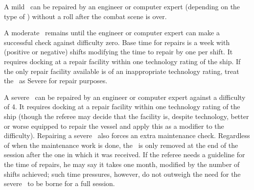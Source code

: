 A mild \Consequence\ can be repaired by an engineer or computer expert (depending on the type of \Consequence) without a roll after the combat scene is over.

A moderate \Consequence\ remains until the engineer or computer expert can make a successful check against difficulty zero. Base time for repairs is a week with (positive or negative) shifts modifying the time to repair by one per shift. It requires docking at a repair facility within one technology rating of the ship. If the only repair facility available is of an inappropriate technology rating, treat the \Consequence\ as Severe for repair purposes.

A severe \Consequence\ can be repaired by an engineer or computer expert against a difficulty of 4. It requires docking at a repair facility within one technology rating of the ship (though the referee may decide that the facility is, despite technology, better or worse equipped to repair the vessel and apply this as a modifier to the difficulty). Repairing a severe \Consequence\ also forces an extra maintenance check. Regardless of when the maintenance work is done, the \Consequence\ is only removed at the end of the session after the one in which it was received. If the referee needs a guideline for the time of repairs, he may say it takes one month, modified by the number of shifts achieved; such time pressures, however, do not outweigh the need for the severe \Consequence\ to be borne for a full session.

